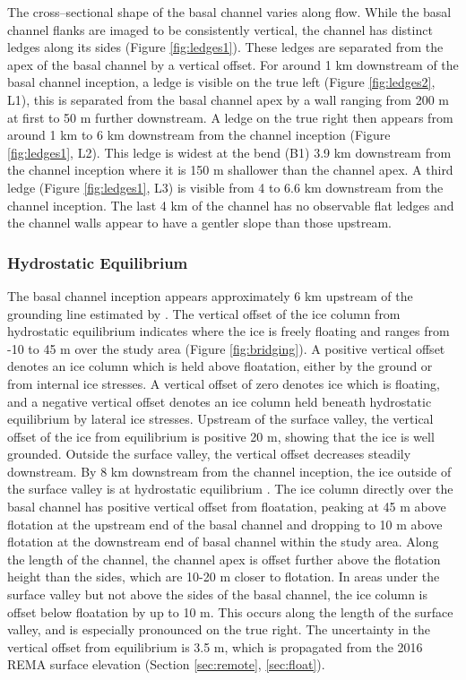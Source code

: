 The cross--sectional shape of the basal channel varies along flow. While the basal channel flanks are imaged to be consistently vertical, the channel has distinct ledges along its sides (Figure \ref{fig:ledges1}). These ledges are separated from the apex of the basal channel by a vertical offset. For around 1 km downstream of the basal channel inception, a ledge is visible on the true left (Figure \ref{fig:ledges2}, L1), this is separated from the basal channel apex by a wall ranging from 200 m at first to 50 m further downstream. A ledge on the true right then appears from around 1 km to 6 km downstream from the channel inception (Figure \ref{fig:ledges1}, L2). This ledge is widest at the bend (B1) 3.9 km downstream from the channel inception  where it is 150 m shallower than the channel apex. A third ledge (Figure \ref{fig:ledges1}, L3) is visible from 4 to 6.6 km downstream  from the channel inception.  The last 4 km of the channel has no observable flat ledges and the channel walls appear to have a gentler slope than those upstream.

\subsubsection{Hydrostatic Equilibrium} \label{sec:floating}

The basal channel inception appears approximately 6 km upstream of the grounding line estimated by \cite{depoorter2013amii}. 
The vertical offset of the ice column from hydrostatic equilibrium indicates where the ice is freely floating and ranges from -10 to 45 m over the study area (Figure \ref{fig:bridging}).
A positive vertical offset denotes an ice column which is held above floatation, either by the ground or from internal ice stresses. A vertical offset of zero denotes ice which is floating, and a negative vertical offset denotes an ice column held beneath hydrostatic equilibrium by lateral ice stresses. 
Upstream of the surface valley, the vertical offset of the ice from equilibrium is positive 20 m, showing that the ice is well grounded. Outside the surface valley,  the vertical offset decreases steadily downstream. By 8 km downstream from the channel inception, the ice outside of the surface valley is at hydrostatic equilibrium . The ice column directly over the basal channel has positive vertical offset from floatation, peaking at 45 m above flotation at the upstream end of the basal channel and dropping to 10 m above flotation at the downstream end of basal channel within the study area. Along the length of the channel, the channel apex is offset further above the flotation height than the sides, which are 10-20 m closer to flotation. In areas under the surface valley but not above the sides of the basal channel, the ice column is offset below floatation by up to 10 m. This occurs along the length of the surface valley, and is especially pronounced on the true right. The uncertainty in the vertical offset from equilibrium is 3.5 m, which is propagated from the 2016 REMA surface elevation (Section \ref{sec:remote}, \ref{sec:float}).


